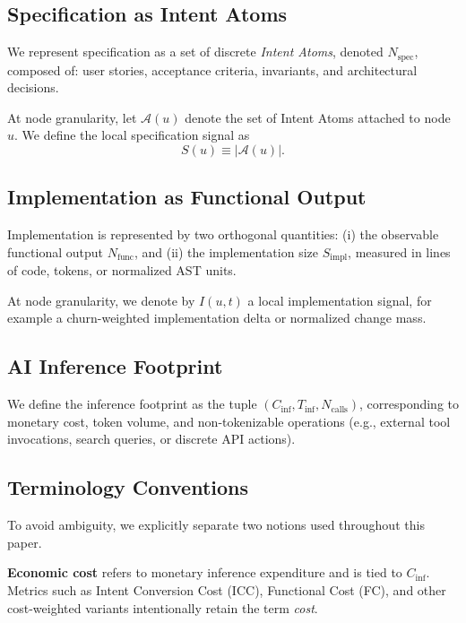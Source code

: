 \documentclass[twocolumn]{aastex701}
\begin{document}
\subsection{Specification as Intent Atoms}

We represent specification as a set of discrete \emph{Intent Atoms},
denoted $N_{\mathrm{spec}}$, composed of:
user stories, acceptance criteria, invariants, and architectural decisions.

At node granularity, let $\mathcal{A}(u)$ denote the set of Intent Atoms
attached to node $u$.
We define the local specification signal as
\begin{equation}
S(u) \equiv |\mathcal{A}(u)|.
\end{equation}

\subsection{Implementation as Functional Output}

Implementation is represented by two orthogonal quantities:
(i) the observable functional output $N_{\mathrm{func}}$,
and (ii) the implementation size $S_{\mathrm{impl}}$,
measured in lines of code, tokens, or normalized AST units.

At node granularity, we denote by $I(u,t)$ a local implementation signal,
for example a churn-weighted implementation delta or normalized change mass.

\subsection{AI Inference Footprint}

We define the inference footprint as the tuple
$(C_{\mathrm{inf}}, T_{\mathrm{inf}}, N_{\mathrm{calls}})$,
corresponding to monetary cost, token volume, and non-tokenizable operations
(e.g., external tool invocations, search queries, or discrete API actions).

\subsection{Terminology Conventions}

To avoid ambiguity, we explicitly separate two notions used throughout this paper.

\textbf{Economic cost} refers to monetary inference expenditure and is tied to
$C_{\mathrm{inf}}$. Metrics such as Intent Conversion Cost (ICC), Functional
Cost (FC), and other cost-weighted variants intentionally retain the term
\emph{cost}.
\end{document}
